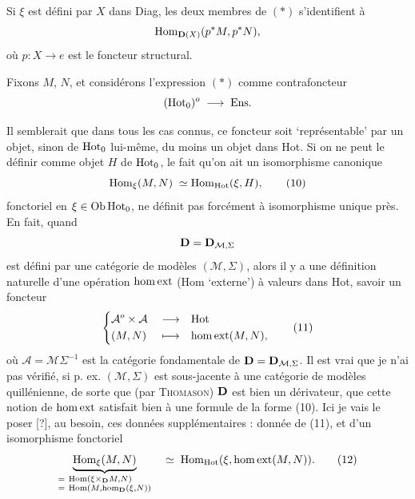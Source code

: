 Si $\xi$ est défini par $X$ dans Diag, les deux membres de $(*)$ s’identifient à
\[
\mathrm{Hom}_{\mathbf{D}(X)}(p^*M,p^*N),
\]
où $p:X\longrightarrow e$ est le foncteur structural.

Fixons $M$, $N$, et considérons l’expression $(*)$ comme contrafoncteur
\[
(\mathrm{Hot}_0)^o\;\longrightarrow\;\mathrm{Ens}.
\]

Il semblerait que dans tous les cas connus, ce foncteur soit ‘représentable’ par un objet, sinon de $\mathrm{Hot}_0$ lui-même, du moins un objet dans Hot. Si on ne peut le définir comme objet $H$ de $\mathrm{Hot}_0$, le fait qu’on ait un isomorphisme canonique
\[
\Hom_{\xi}(M,N)\;\simeq\Hom_{\Hot}(\xi,H),
\tag*{(10)}
\]
fonctoriel en $\xi\in\mathrm{Ob}\,\mathrm{Hot}_0$, ne définit pas forcément
à isomorphisme unique près. En fait, quand
\[
\mathbf{D}=\mathbf{D}_{\mathcal{M},\Sigma}
\]
est défini par une catégorie de modèles $(\mathcal{M},\Sigma)$, alors il y a une définition naturelle d’une opération $\mathrm{hom}\,\mathrm{ext}$ (Hom ‘externe’) à valeurs dans Hot, savoir un foncteur
\[
\left\{
\begin{aligned}
&\mathcal{A}^o\times\mathcal{A} &&\longrightarrow &&\mathrm{Hot}\\
&(M,N) &&\longmapsto &&\homext(M,N),
\end{aligned}
\right.
\tag*{(11)}
\]
où $\mathcal{A}=\mathcal{M}\Sigma^{-1}$ est la catégorie fondamentale de $\mathbf{D}=\mathbf{D}_{\mathcal{M},\Sigma}$. Il est vrai que je n’ai pas vérifié, si p. ex. $(\mathcal{M},\Sigma)$ est sous-jacente à une catégorie de modèles quillénienne, de sorte que (par \textsc{Thomason}) $\mathbf{D}$ est bien un dérivateur, que cette notion de $\mathrm{hom}\,\mathrm{ext}$ satisfait bien à une formule de la forme (10). Ici je vais le poser [?], au besoin, ces données supplémentaires : donnée de (11), et d’un isomorphisme fonctoriel
\[
\underbrace{\Hom_{\xi}(M,N)}_{\begin{subarray}{l}=\ \Hom(\xi\times_{\D}M,N)\\ =\ \Hom(M,\hm_{\D}(\xi,N))\end{subarray}}
\quad\simeq\;\Hom_{\Hot}(\xi,\homext(M,N)).
\tag*{(12)}
\]

